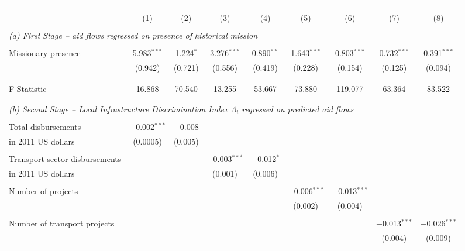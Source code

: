 \documentclass[11pt, oneside]{article}   	%
\begin{document}
\begin{table}[!h]
{  \begin{tabular}{@{\extracolsep{5pt}}lcccccccc}
  \\[-1.8ex]\hline
  \hline \\[-1.8ex]
  \\[-1.8ex] & (1) & (2) & (3) & (4) & (5) & (6) & (7) & (8)\\
  \hline \\[-1.8ex]
  \multicolumn{9}{l}{\textit{(a) First Stage -- aid flows regressed on presence of historical mission}} \\
  \\[-1.8ex]
  Missionary presence & 5.983$^{***}$ & 1.224$^{*}$ & 3.276$^{***}$ & 0.890$^{**}$ & 1.643$^{***}$ & 0.803$^{***}$ & 0.732$^{***}$ & 0.391$^{***}$ \\
   & (0.942) & (0.721) & (0.556) & (0.419) & (0.228) & (0.154) & (0.125) & (0.094) \\
   & & & & & & & & \\
 \\[-1.8ex]
 F Statistic & 16.868 & 70.540& 13.255 & 53.667 & 73.880 & 119.077& 63.364& 83.522\\
 \hline \\[-1.8ex]
 \\[-1.8ex]
\multicolumn{9}{l}{\textit{(b) Second Stage -- Local Infrastructure Discrimination Index $\Lambda_{i}$ regressed on predicted aid flows}} \\
\\[-1.8ex]
Total disbursements & $-$0.002$^{***}$ & $-$0.008 &  &  &  &  &  &  \\
\hspace*{3mm} in 2011 US dollars & (0.0005) & (0.005) &  &  &  &  &  &  \\
 & & & & & & & & \\
Transport-sector disbursements &  &  & $-$0.003$^{***}$ & $-$0.012$^{*}$ &  &  &  &  \\
\hspace*{3mm} in 2011 US dollars &  &  & (0.001) & (0.006) &  &  &  &  \\
 & & & & & & & & \\
Number of projects &  &  &  &  & $-$0.006$^{***}$ & $-$0.013$^{***}$ &  &  \\
 &  &  &  &  & (0.002) & (0.004) &  &  \\
 & & & & & & & & \\
Number of transport projects &  &  &  &  &  &  & $-$0.013$^{***}$ & $-$0.026$^{***}$ \\
 &  &  &  &  &  &  & (0.004) & (0.009) \\

\end{tabular}}
\end{table}
\end{document}
